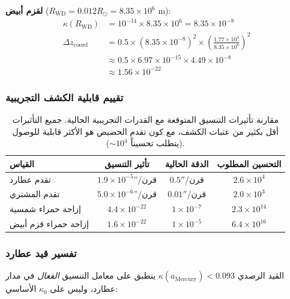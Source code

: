 \documentclass[11pt,a4paper]{article}
\begin{document}
	\textbf{لقزم أبيض} ($R_{\text{WD}} = 0.012 R_\odot = 8.35 \times 10^6$ m):
	\begin{align}
		\kappa(R_{\text{WD}}) &= 10^{-14} \times 8.35 \times 10^6 = 8.35 \times 10^{-8} \\
		\Delta z_{\text{coord}} &= 0.5 \times (8.35 \times 10^{-8})^2 \times \left(\frac{1.77 \times 10^3}{8.35 \times 10^6}\right)^2 \\
		&\approx 0.5 \times 6.97 \times 10^{-15} \times 4.49 \times 10^{-8} \\
		&\approx 1.56 \times 10^{-22}
	\end{align}
	
	\subsubsection{تقييم قابلية الكشف التجريبية}
	
	\begin{table}[htbp]
		\centering
		\begin{english}
			\begin{tabular}{lccc}
				\toprule
				\textbf{القياس} & \textbf{تأثير التنسيق} & \textbf{الدقة الحالية} & \textbf{التحسين المطلوب} \\
				\midrule
				تقدم عطارد & $1.9 \times 10^{-5}$''/قرن & $0.5''$/قرن & $2.6 \times 10^4$ \\
				تقدم المشتري & $5.0 \times 10^{-6}$''/قرن & $0.01''$/قرن & $2.0 \times 10^3$ \\
				إزاحة حمراء شمسية & $4.4 \times 10^{-22}$ & $1 \times 10^{-7}$ & $2.3 \times 10^{14}$ \\
				إزاحة حمراء قزم أبيض & $1.6 \times 10^{-22}$ & $1 \times 10^{-5}$ & $6.4 \times 10^{16}$ \\
				\bottomrule
			\end{tabular}
		\end{english}
		\caption{مقارنة تأثيرات التنسيق المتوقعة مع القدرات التجريبية الحالية. جميع التأثيرات أقل بكثير من عتبات الكشف، مع كون تقدم الحضيض هو الأكثر قابلية للوصول (يتطلب تحسيناً $\sim 10^4$).}
	\end{table}
	
	\subsubsection{تفسير قيد عطارد}
	
	القيد الرصدي $\kappa(a_{\text{Mercury}}) < 0.093$ ينطبق على معامل التنسيق \textit{الفعال} في مدار عطارد، وليس على $\kappa_0$ الأساسي:
	
\end{document}
